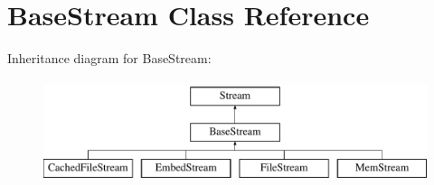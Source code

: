 \hypertarget{class_base_stream}{}\section{Base\+Stream Class Reference}
\label{class_base_stream}
Inheritance diagram for Base\+Stream\+:\begin{figure}[H]
\begin{center}
\leavevmode
\includegraphics[height=3.000000cm]{class_base_stream}
\end{center}
\end{figure}
